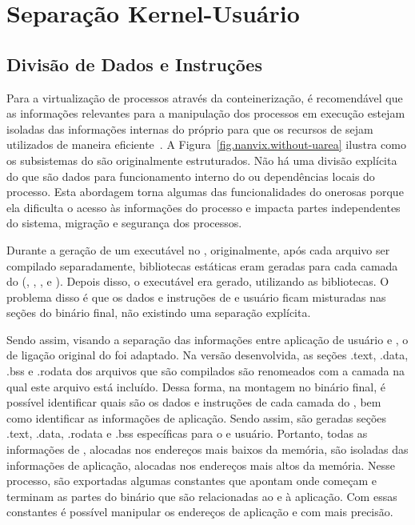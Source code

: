 \section{Separação Kernel-Usuário}
\label{sec.dev.kernel-usuario}

\subsection{Divisão de Dados e Instruções}
\label{sec.divisao-dados-instrucao}
    Para a virtualização de processos através da conteinerização, é recomendável que as informações relevantes para a manipulação dos processos em execução estejam isoladas das informações internas do próprio \os para que os recursos de \hardware sejam utilizados de maneira eficiente~\cite{choudhary2017critical}.
    A Figura~\ref{fig.nanvix.without-uarea} ilustra como os subsistemas do \nanvix são originalmente estruturados. Não há uma divisão explícita do que são dados para funcionamento interno do \os ou dependências locais do processo.
    Esta abordagem torna algumas das funcionalidades do \os onerosas porque ela dificulta o acesso às informações do processo e impacta partes independentes do sistema, \eg migração e segurança dos processos.

    Durante a geração de um executável no \nanvix, originalmente, após cada arquivo ser compilado separadamente, bibliotecas estáticas eram geradas para cada camada do \nanvix (\hal, \microkernel, \libnanvix, \ulibc e \multikernel). Depois disso, o executável era gerado, utilizando as bibliotecas. O problema disso é que os dados e instruções de  e usuário ficam misturadas nas seções do binário final, não existindo uma separação explícita.

    Sendo assim, visando a separação das informações entre aplicação de usuário e , o \script de ligação original do \nanvix foi adaptado. Na versão desenvolvida, as seções .text, .data, .bss e .rodata dos arquivos que são compilados são renomeados com a camada na qual este arquivo está incluído. Dessa forma, na montagem no binário final, é possível identificar quais são os dados e instruções de cada camada do \nanvix, bem como identificar as informações de aplicação. Sendo assim, são geradas seções .text, .data, .rodata e .bss específicas para o  e usuário. Portanto, todas as informações de , alocadas nos endereços mais baixos da memória, são isoladas das informações de aplicação, alocadas nos endereços mais altos da memória. Nesse processo, são exportadas algumas constantes que apontam onde começam e terminam as partes do binário que são relacionadas ao  e à aplicação. Com essas constantes é possível manipular os endereços de aplicação e  com mais precisão.
    

